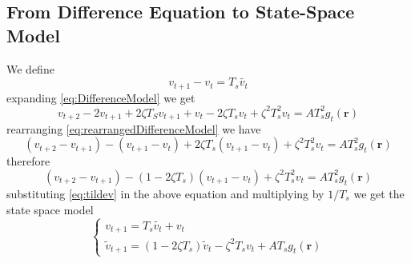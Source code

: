\documentclass[a4paper,10pt]{article}
\begin{document}
\subsection*{From Difference Equation to State-Space Model}
We define
\begin{equation}\label{eq:tildev}
v_{t+1}-v_t=T_s\tilde{v_t}
\end{equation}
expanding \eqref{eq:DifferenceModel} we get
\begin{equation}\label{eq:rearrangedDifferenceModel}
 v_{t+2}-2v_{t+1}+2\zeta T_S v_{t+1}+v_t-2\zeta
T_sv_t+\zeta^2T_s^2v_t=AT_s^2g_t\left( \mathbf{r}\right)
\end{equation}
rearranging \eqref{eq:rearrangedDifferenceModel} we have
\begin{equation}
(v_{t+2}-v_{t+1})-(v_{t+1}-v_t)+2\zeta
T_s(v_{t+1}-v_t)+\zeta^2T_s^2v_t=AT_s^2g_t\left( \mathbf{r}\right)
\end{equation}
therefore
\begin{equation}
(v_{t+2}-v_{t+1})-(1-2\zeta T_s)(v_{t+1}-v_t)+\zeta^2T_s^2v_t=AT_s^2g_t\left(
\mathbf{r}\right)
\end{equation}
substituting \eqref{eq:tildev} in the above equation and multiplying by $1/T_s$
we get the state space model
\begin{equation}\label{eq:StateSpaceModel}
\begin{cases}
v_{t+1}=T_s\tilde{v_t}+v_t\\
\tilde{v}_{t+1}=(1-2\zeta T_s)\tilde{v}_t-\zeta^2T_sv_t+AT_sg_t\left(
\mathbf{r}\right)
\end{cases}
\end{equation}
\end{document}
